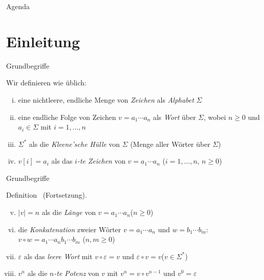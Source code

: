 \documentclass[xcolor=dvipsnames, aspectratio=169]{beamer}
\begin{document}
\frame[t,plain,label=titel]{
	\titlepage
}

\begin{frame}{Agenda}
       \tableofcontents[ 
  		currentsubsection, 
  		hideothersubsections, 
   	 	sectionstyle=show, 
   	 ] 
\end{frame}

\section{Einleitung}

\printSectionYes

\begin{frame}[<+->]{Grundbegriffe}
\begin{defi}
Wir definieren wie üblich:
\begin{enumerate}[(i)]
\item eine nichtleere, endliche Menge von \textit{Zeichen} als \textit{Alphabet} $\Sigma$
\item eine endliche Folge von Zeichen $v=a_1\cdots a_n$ als \textit{Wort} über $\Sigma$, wobei $n\geq 0$ und $a_i\in\Sigma$ mit $i=1,\dots,n$
\item $\Sigma^*$ als die \textit{Kleene'sche Hülle} von $\Sigma$ (Menge aller Wörter über $\Sigma$)
\item $v[i]=a_i$ als das \textit{$i$-te Zeichen} von $v=a_1\cdots a_n$ \hfill($i=1,\dots,n$, $n\geq 0$)
\end{enumerate}
\end{defi}
\end{frame}

\begin{frame}[<+->]{Grundbegriffe}
\begin{mybox}{Definition \thedefinition\ (Fortsetzung).}
\begin{enumerate}[(i)]\setcounter{enumi}{4}
\item $\vert v\vert=n$ als die \textit{Länge} von $v=a_1\cdots a_n$\hfill($n\geq 0$)
\item die \textit{Konkatenation} zweier Wörter $v=a_1\cdots a_n$ und $w=b_1\cdots b_m$: $v\circ w=a_1\cdots a_nb_1\cdots b_m$ \hfill($n,m\geq 0$)
\item $\varepsilon$ als das \textit{leere Wort} mit $v\circ\varepsilon = v$ und $\varepsilon\circ v=v$\hfill($v\in\Sigma^*$)
\item $v^n$ als die \textit{$n$-te Potenz} von $v$ mit $v^n=v\circ v^{n-1}$ und $v^0 =\varepsilon$
\end{enumerate}
\end{mybox}
\end{frame}
\end{document}
